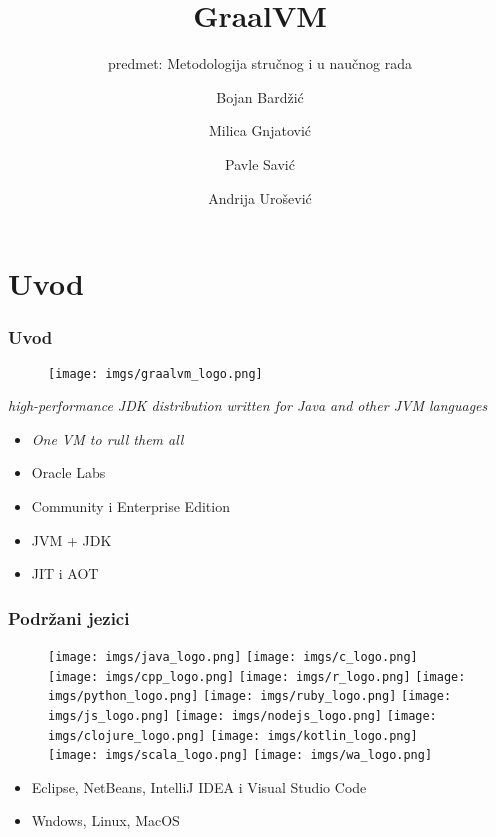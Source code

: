\documentclass{beamer}
\title{GraalVM}
\subtitle{predmet: Metodologija stručnog i u naučnog rada}
\author{Bojan Bardžić \and Milica Gnjatović \and Pavle Savić \and Andrija Urošević}
\institute{Matematički fakultet}
\date{}
\begin{document}
	\begin{frame}
		\titlepage
	\end{frame}
	
	\section{Uvod}
	\begin{frame}
		\frametitle{Uvod}
		
		\begin{figure}
			\begin{center}
				\texttt{[image: imgs/graalvm\_logo.png]}	
			\end{center} 
		\end{figure}
	
		\center	
		\textit{high-performance JDK distribution written for Java and other JVM languages}

		\begin{flushleft}
			\begin{itemize}
				\item \emph{One VM to rull them all}
				\item Oracle Labs
				\item Community i Enterprise Edition
				\item JVM + JDK	
				\item JIT i AOT
			\end{itemize}
		\end{flushleft}


	\end{frame}

	\begin{frame}
		\frametitle{Podržani jezici}
		\begin{figure}
			\texttt{[image: imgs/java\_logo.png]}
			\texttt{[image: imgs/c\_logo.png]}
			\texttt{[image: imgs/cpp\_logo.png]}
			\texttt{[image: imgs/r\_logo.png]}
			\texttt{[image: imgs/python\_logo.png]}
			\texttt{[image: imgs/ruby\_logo.png]}
			\texttt{[image: imgs/js\_logo.png]}
			\texttt{[image: imgs/nodejs\_logo.png]}
			\texttt{[image: imgs/clojure\_logo.png]}
			\texttt{[image: imgs/kotlin\_logo.png]}
			\texttt{[image: imgs/scala\_logo.png]}
			\texttt{[image: imgs/wa\_logo.png]}
		\end{figure}
		
		\begin{flushleft}
			\begin{itemize}
				\item Eclipse, NetBeans, IntelliJ IDEA i Visual Studio Code
				\item Wndows, Linux, MacOS
			\end{itemize}
		\end{flushleft}
		
	
	\end{frame}	
	
\end{document}
